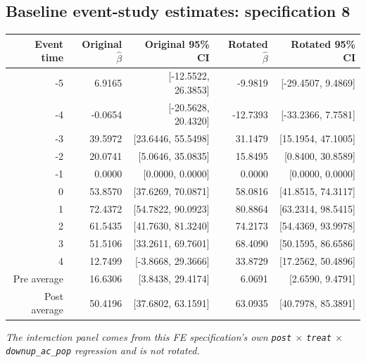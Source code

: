 \documentclass[10pt]{article}
\begin{document}
\subsection*{Baseline event-study estimates: specification 8}
\begin{center}
\scriptsize
\begin{tabular}{r rr rr}
\toprule
Event time & Original $\hat\beta$ & Original 95\% CI & Rotated $\hat\beta$ & Rotated 95\% CI \\
\midrule
-5 & 6.9165 & [-12.5522, 26.3853] & -9.9819 & [-29.4507, 9.4869] \\
-4 & -0.0654 & [-20.5628, 20.4320] & -12.7393 & [-33.2366, 7.7581] \\
-3 & 39.5972 & [23.6446, 55.5498] & 31.1479 & [15.1954, 47.1005] \\
-2 & 20.0741 & [5.0646, 35.0835] & 15.8495 & [0.8400, 30.8589] \\
-1 & 0.0000 & [0.0000, 0.0000] & 0.0000 & [0.0000, 0.0000] \\
0 & 53.8570 & [37.6269, 70.0871] & 58.0816 & [41.8515, 74.3117] \\
1 & 72.4372 & [54.7822, 90.0923] & 80.8864 & [63.2314, 98.5415] \\
2 & 61.5435 & [41.7630, 81.3240] & 74.2173 & [54.4369, 93.9978] \\
3 & 51.5106 & [33.2611, 69.7601] & 68.4090 & [50.1595, 86.6586] \\
4 & 12.7499 & [-3.8668, 29.3666] & 33.8729 & [17.2562, 50.4896] \\
\midrule
Pre average & 16.6306 & [3.8438, 29.4174] & 6.0691 & [2.6590, 9.4791] \\
Post average & 50.4196 & [37.6802, 63.1591] & 63.0935 & [40.7978, 85.3891] \\
\bottomrule
\end{tabular}
\end{center}
\medskip
\textit{The interaction panel comes from this FE specification's own \texttt{post} $\times$ \texttt{treat} $\times$ \texttt{downup\_ac\_pop} regression and is not rotated.}
\clearpage
\end{document}
